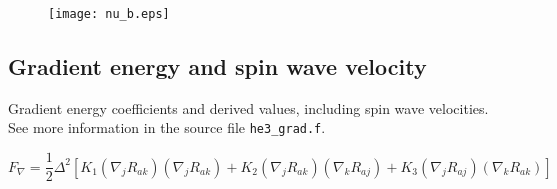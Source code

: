 \documentclass[a4paper]{article}
\begin{document}
\begin{figure}[h]
\texttt{[image: nu\_b.eps]}\\
\end{figure}

\eject
\subsection*{Gradient energy and spin wave velocity}

Gradient energy coefficients and derived values, including spin wave
velocities. See more information in the source file {\tt he3\_grad.f}.

$$
F_\nabla = \frac12 \Delta^2 \left[
  K_1 (\nabla_j R_{ak})(\nabla_j R_{ak})
+ K_2 (\nabla_j R_{ak})(\nabla_k R_{aj})
+ K_3 (\nabla_j R_{aj})(\nabla_k R_{ak}) \right]
$$

\end{document}
